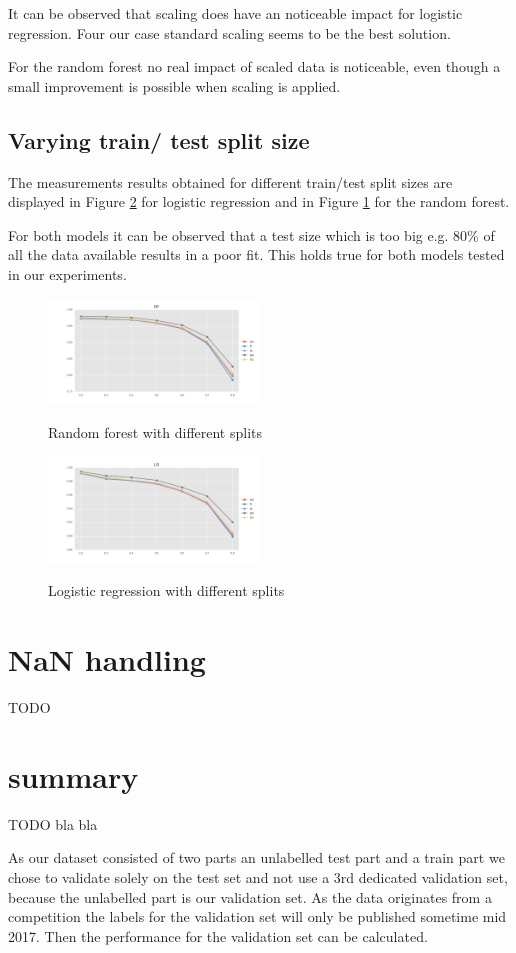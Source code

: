 \documentclass{sig-alternate-05-2015}
\begin{document}
It can be observed that scaling does have an noticeable impact for logistic regression. Four our case standard scaling seems to be the best solution. 


For the random forest no real impact of scaled data is noticeable, even though a small improvement is possible when scaling is applied.

\subsection{Varying train/ test split size}

The measurements results obtained for different train/test split sizes are displayed in Figure \ref{fig:lr_splits} for logistic regression and in Figure \ref{fig:rf_splits} for the random forest.
 
For both models it can be observed that a test size which is too big e.g. 80\% of all the data available results in a poor fit.
This holds true for both models tested in our experiments.

\begin{figure}[h]
  \centering
  \caption{Random forest with different splits}
  \includegraphics[width=0.5\textwidth]{../plots/RF_split}
  \label{fig:rf_splits}
\end{figure}


\begin{figure}[h]
  \centering
  \caption{Logistic regression with different splits}
  \includegraphics[width=0.5\textwidth]{../plots/LR_split}
  \label{fig:lr_splits}
\end{figure}

\section{NaN handling}

TODO

\section{summary}

TODO bla bla

As our dataset consisted of two parts an unlabelled test part and a train part we chose to validate solely on the test set and not use a 3rd dedicated validation set, because the unlabelled part is our validation set. As the data originates from a competition the labels for the validation set will only be published sometime mid 2017. Then the performance for the validation set can be calculated.
\end{document}
